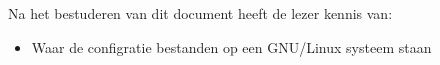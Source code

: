 Na het bestuderen van dit document heeft de lezer kennis van:
\begin{itemize}
\item Waar de configratie bestanden op een GNU/Linux systeem staan

\end{itemize}
